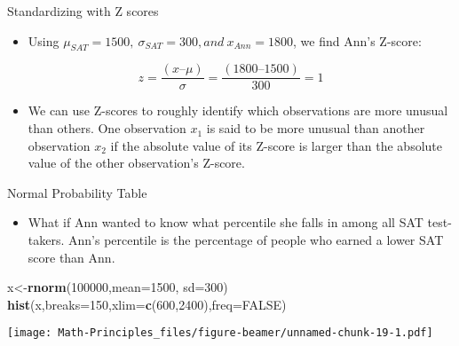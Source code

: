 \documentclass[
  ignorenonframetext,
]{beamer}
\newenvironment{Shaded}{\begin{snugshade}}{\end{snugshade}}
\newcommand{\DataTypeTok}[1]{\textcolor[rgb]{0.13,0.29,0.53}{#1}}
\newcommand{\DecValTok}[1]{\textcolor[rgb]{0.00,0.00,0.81}{#1}}
\newcommand{\KeywordTok}[1]{\textcolor[rgb]{0.13,0.29,0.53}{\textbf{#1}}}
\newcommand{\NormalTok}[1]{#1}
\newcommand{\OtherTok}[1]{\textcolor[rgb]{0.56,0.35,0.01}{#1}}
\providecommand{\tightlist}{%
  \setlength{\itemsep}{0pt}\setlength{\parskip}{0pt}}
\begin{document}
\begin{frame}{Standardizing with Z scores}
\protect\hypertarget{standardizing-with-z-scores-1}{}

\begin{itemize}
\tightlist
\item
  Using
  \(\mu_{SAT} = 1500, \ \sigma_{SAT} = 300, and \ x_{Ann} = 1800\), we
  find Ann's Z-score:
\end{itemize}

\[z = \frac{(x – μ)}{σ}= \frac{(1800 – 1500)}{300}= 1\]

\begin{itemize}
\tightlist
\item
  We can use Z-scores to roughly identify which observations are more
  unusual than others. One observation \(x_1\) is said to be more
  unusual than another observation \(x_2\) if the absolute value of its
  Z-score is larger than the absolute value of the other observation's
  Z-score.
\end{itemize}

\end{frame}

\begin{frame}[fragile]{Normal Probability Table}
\protect\hypertarget{normal-probability-table}{}

\begin{itemize}
\tightlist
\item
  What if Ann wanted to know what percentile she falls in among all SAT
  test-takers. Ann's percentile is the percentage of people who earned a
  lower SAT score than Ann.
\end{itemize}

\begin{Shaded}
\begin{Highlighting}[]
\NormalTok{x<-}\KeywordTok{rnorm}\NormalTok{(}\DecValTok{100000}\NormalTok{,}\DataTypeTok{mean=}\DecValTok{1500}\NormalTok{, }\DataTypeTok{sd=}\DecValTok{300}\NormalTok{)}
\KeywordTok{hist}\NormalTok{(x,}\DataTypeTok{breaks=}\DecValTok{150}\NormalTok{,}\DataTypeTok{xlim=}\KeywordTok{c}\NormalTok{(}\DecValTok{600}\NormalTok{,}\DecValTok{2400}\NormalTok{),}\DataTypeTok{freq=}\OtherTok{FALSE}\NormalTok{)}
\end{Highlighting}
\end{Shaded}

\texttt{[image: Math-Principles\_files/figure-beamer/unnamed-chunk-19-1.pdf]}

\end{frame}
\end{document}
